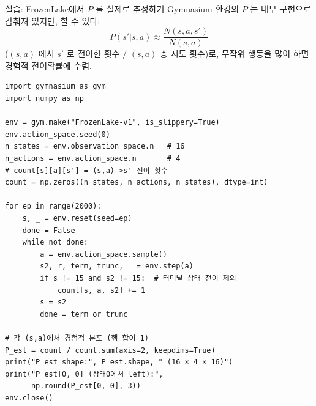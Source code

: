 \begin{frame}[fragile,shrink=40]{실습: FrozenLake에서 $P$ 를 실제로 추정하기}
  Gymnasium 환경의 $P$ 는 내부 구현으로 감춰져 있지만,
  할 수 있다:
  \[
  P(s'|s,a) \approx \frac{N(s,a,s')}{N(s,a)}
  \]
  ($(s,a)$ 에서 $s'$ 로 전이한 횟수 / $(s,a)$ 총 시도 횟수)로,
  무작위 행동을 많이 하면 경험적 전이확률에 수렴.
  \begin{lstlisting}
import gymnasium as gym
import numpy as np

env = gym.make("FrozenLake-v1", is_slippery=True)
env.action_space.seed(0)
n_states = env.observation_space.n   # 16
n_actions = env.action_space.n       # 4
# count[s][a][s'] = (s,a)->s' 전이 횟수
count = np.zeros((n_states, n_actions, n_states), dtype=int)

for ep in range(2000):
    s, _ = env.reset(seed=ep)
    done = False
    while not done:
        a = env.action_space.sample()
        s2, r, term, trunc, _ = env.step(a)
        if s != 15 and s2 != 15:  # 터미널 상태 전이 제외
            count[s, a, s2] += 1
        s = s2
        done = term or trunc

# 각 (s,a)에서 경험적 분포 (행 합이 1)
P_est = count / count.sum(axis=2, keepdims=True)
print("P_est shape:", P_est.shape, " (16 × 4 × 16)")
print("P_est[0, 0] (상태0에서 left):",
      np.round(P_est[0, 0], 3))
env.close()
  \end{lstlisting}
\end{frame}
